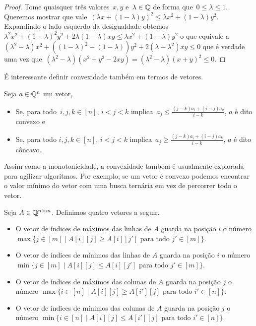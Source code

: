 \begin{proof}
Tome quaisquer três valores~$x,y$ e~$\lambda \in \mathbb{Q}$ de forma que~${ 0 \leq \lambda \leq 1 }$. Queremos mostrar que vale~${ (\lambda x + (1 - \lambda)y)^2 \leq \lambda x^2 + (1 - \lambda) y^2 }$. Expandindo o lado esquerdo da desigualdade obtemos~${ \lambda^2x^2 + (1 - \lambda)^2y^2 + 2\lambda(1-\lambda)xy \leq \lambda x^2 + (1 - \lambda)y^2 }$ o que equivale a~${ (\lambda^2 - \lambda)x^2 + ((1-\lambda)^2 - (1 - \lambda))y^2 + 2(\lambda - \lambda^2)xy \leq 0 }$ que é verdade uma vez que~${ (\lambda^2 - \lambda)(x^2 + y^2 - 2xy) = (\lambda^2 - \lambda)(x + y)^2 \leq 0 }$.
\end{proof}

É interessante definir convexidade também em termos de vetores.

\begin{defi}
Seja $a \in \mathbb{Q}^n$ um vetor,
\begin{itemize}
    \item Se, para todo~$i,j,k \in [n]$, $i < j < k$ implica~$a_j \leq \frac{(j-k)a_i + (i-j)a_k}{i-k}$, $a$ é dito convexo e
    \item Se, para todo $i,j,k \in [n]$, $i < j < k$ implica~$a_j \geq \frac{(j-k)a_i + (i-j)a_k}{i-k}$, $a$ é dito côncavo.
\end{itemize}
\end{defi}

Assim como a monotonicidade, a convexidade também é usualmente explorada para agilizar algoritmos. Por exemplo, se um vetor é convexo podemos encontrar o valor mínimo do vetor com uma busca ternária em vez de percorrer todo o vetor.  

\begin{defi}
Seja $A \in \mathbb{Q}^{n \times m}$. Definimos quatro vetores a seguir.
\begin{itemize}
    \item O vetor de índices de máximos das linhas de $A$ guarda na posição $i$ 
          o número $\max\{j \in [m] \mid A[i][j] \geq A[i][j'] \text{ para todo } j' \in [m]\}$. 
    \item O vetor de índices de mínimos das linhas de $A$ guarda na posição $i$ 
          o número $\min\{j \in [m] \mid A[i][j] \leq A[i][j'] \text{ para todo } j' \in [m]\}$. 
    \item O vetor de índices de máximos das colunas de $A$ guarda na posição $j$ 
          o número $\max\{i \in [n] \mid A[i][j] \geq A[i'][j] \text{ para todo } i' \in [n]\}$. 
    \item O vetor de índices de mínimos das colunas de $A$ guarda na posição $j$ 
          o número $\min\{i \in [n] \mid A[i][j] \leq A[i'][j] \text{ para todo } i' \in [n]\}$. 
\end{itemize}
\end{defi}

